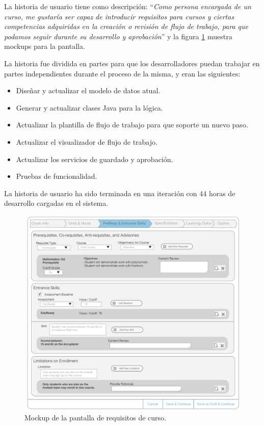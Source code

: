 La historia de usuario tiene como descripción: \enquote{\textit{Como persona encargada de un curso, me gustaría ser capaz de introducir requisitos para cursos y ciertas competencias adquiridas en la creación o revisión de flujo de trabajo, para que podamos seguir durante su desarrollo y aprobación}} y la figura \ref{course_req} muestra mockups para la pantalla.

La historia fue dividida en partes para que los desarrolladores puedan trabajar en partes independientes durante el proceso de la misma, y eran las siguientes:
\begin{itemize}
	\item Diseñar y actualizar el modelo de datos atual.
	\item Generar y actualizar clases Java para la lógica.
	\item Actualizar la plantilla de flujo de trabajo para que soporte un nuevo paso.
	\item Actualizar el visualizador de flujo de trabajo.
	\item Actualizar los servicios de guardado y aprobación.
	\item Pruebas de funcionalidad.
\end{itemize}

La historia de usuario ha sido terminada en una iteración con 44 horas de desarrollo cargadas en el sistema.

\begin{figure}[H]
\centering
\includegraphics[scale=0.3]{Capitulos/DesarrollodelaAplicacion/Imagenes/course_req}
\caption{Mockup de la pantalla de requisitos de curso.}
  \label{course_req}
\end{figure}


